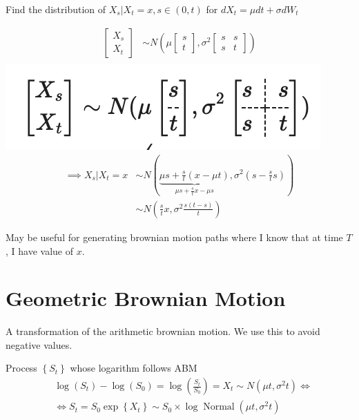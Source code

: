 \documentclass[
  oneside]{book}
\begin{document}
Find the distribution of \(X_{s} | X_{t} = x, s\in (0,t)\) for \(dX_{t} = \mu dt + \sigma dW_{t}\)

\[
\begin{aligned}
\left[ \begin{array}{c}
X_{s} \\
X_{t}
\end{array} \right] &\sim N(\mu \left[ \begin{array}{c}
s \\
t
\end{array} \right], \sigma^{2} \left[ \begin{array}{cc}
s & s \\
s & t
\end{array} \right]  )\\
\end{aligned}
\]
\includegraphics{Notes/Obsidian-Attachments/10-Simulation-5.png}
\[
\begin{aligned}
\implies X_{s} | X_{t} = x &\sim N\left( \underbrace{ \mu s+\frac{s}{t}(x-\mu t) }_{ \mu s+\frac{s}{t}x-\mu s },
\sigma^{2}\left( s-\frac{s}{t}s \right)\right)\\
&\sim N\left( \frac{s}{t}x, \sigma^{2} \frac{s(t-s)}{t}\right)
\end{aligned}
\]

May be useful for generating brownian motion paths where I know that at time \(T\), I have value of \(x\).

\hypertarget{geometric-brownian-motion}{%
\section{Geometric Brownian Motion}\label{geometric-brownian-motion}}

A transformation of the arithmetic brownian motion. We use this to avoid negative values.

Process \(\left\{S_t\right\}\) whose logarithm follows ABM
\[
\begin{aligned}
& \log \left(S_t\right)-\log \left(S_0\right)=\log \left(\frac{S_t}{S_0}\right)=X_t \sim N\left(\mu t, \sigma^2 t\right) \Leftrightarrow \\
& \Leftrightarrow S_t=S_0 \exp \left\{X_t\right\} \sim S_0 \times \log \operatorname{Normal}\left(\mu t, \sigma^2 t\right)
\end{aligned}
\]
\end{document}

